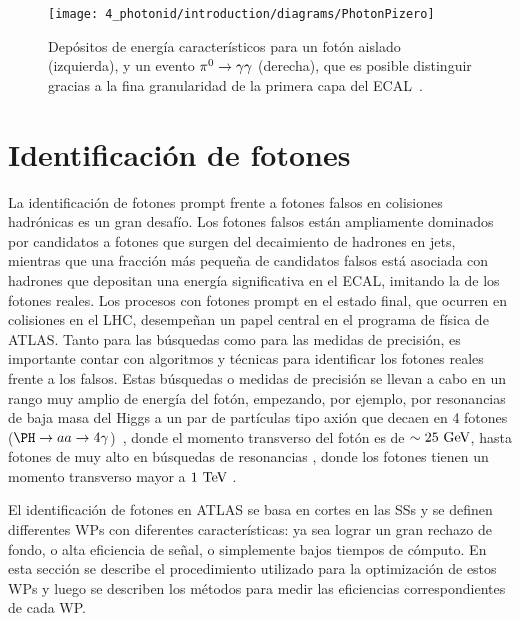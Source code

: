 \begin{figure}[ht!]
    \centering
    \texttt{[image: 4\_photonid/introduction/diagrams/PhotonPizero]}
    \caption{Dep\'ositos de energ\'ia caracter\'isticos para un fot\'on aislado (izquierda), y un evento \(\pi^{0}\rightarrow\gamma\gamma\) (derecha), que es posible distinguir gracias a la fina granularidad de la primera capa del \ac{ECAL}~\cite{ATLAS-ECAL-Pizero}.}
    \label{fig:pid_ss:ss:pizero}
\end{figure}






\section{Identificaci\'on de fotones}
\label{sec:pid_ss:pid}

La identificación de fotones prompt frente a fotones falsos en colisiones hadrónicas es un gran desaf\'io. Los fotones falsos están ampliamente dominados por candidatos a fotones que surgen del decaimiento de hadrones en jets, mientras que una fracción más pequeña de candidatos falsos está asociada con hadrones que depositan una energía significativa en el \ac{ECAL}, imitando la de los fotones reales.
Los procesos con fotones prompt en el estado final, que ocurren en colisiones \pp en el \ac{LHC}, desempeñan un papel central en el programa de física de \ac{ATLAS}. Tanto para las búsquedas como para las medidas de precisión, es importante contar con algoritmos y técnicas para identificar los fotones reales frente a los falsos. Estas b\'usquedas o medidas de precisi\'on se llevan a cabo en un rango muy amplio de energ\'ia del fotón, empezando, por ejemplo, por resonancias de baja masa del Higgs a un par de partículas tipo axión que decaen en 4 fotones (\(\PH\to aa \to 4\gamma\))~\cite{ATLAS-HiggsTo4Gamma}, donde el momento transverso del fotón es de \(\sim 25~\text{GeV}\), hasta fotones de muy alto \pt en búsquedas de resonancias \gammajet, donde los fotones tienen un momento transverso mayor a \(1~\text{TeV}\) .

El identificaci\'on de fotones en \ac{ATLAS} se basa en cortes en las \acp{SS} y se definen differentes \acfp{WP} con diferentes caracter\'isticas: ya sea lograr un gran rechazo de fondo, o alta eficiencia de se\~nal, o simplemente bajos tiempos de c\'omputo. En esta sección se describe el procedimiento utilizado para la optimizaci\'on de estos \acp{WP} y luego se describen los m\'etodos para medir las eficiencias correspondientes de cada \ac{WP}.



